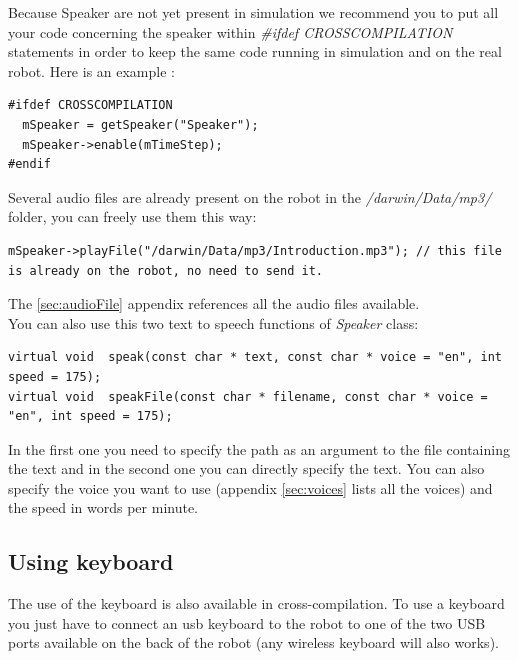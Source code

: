 \documentclass[a4paper, 12pt]{article}  		%
\begin{document}
Because Speaker are not yet present in simulation we recommend you to put all your code concerning the speaker within \textit{\#ifdef CROSSCOMPILATION} statements in order to keep the same code running in simulation and on the real robot. Here is an example :\\
\lstset{language=c++} 
\lstset{commentstyle=\textit} 
\begin{lstlisting} 
#ifdef CROSSCOMPILATION
  mSpeaker = getSpeaker("Speaker");
  mSpeaker->enable(mTimeStep);
#endif
\end{lstlisting}

Several audio files are already present on the robot in the \textit{/darwin/Data/mp3/} folder, you can freely use them this way:\\
\lstset{language=c++} 
\lstset{commentstyle=\textit} 
\begin{lstlisting} 
mSpeaker->playFile("/darwin/Data/mp3/Introduction.mp3"); // this file is already on the robot, no need to send it.
\end{lstlisting}

The \ref{sec:audioFile} appendix references all the audio files available.\\

You can also use this two text to speech functions of \textit{Speaker} class:\\
\lstset{language=c++} 
\lstset{commentstyle=\textit} 
\begin{lstlisting} 
virtual void  speak(const char * text, const char * voice = "en", int speed = 175);
virtual void  speakFile(const char * filename, const char * voice = "en", int speed = 175);
\end{lstlisting}

In the first one you need to specify the path as an argument to the file containing the text and in the second one you can directly specify the text. You can also specify the voice you want to use (appendix \ref{sec:voices} lists all the voices) and the speed in words per minute.\\

\newpage
\subsection{Using keyboard}

The use of the keyboard is also available in cross-compilation. To use a keyboard you just have to connect an usb keyboard to the robot to one of the two USB ports available on the back of the robot (any wireless keyboard will also works).\\
\end{document}
